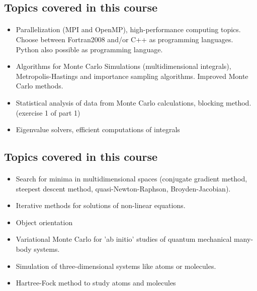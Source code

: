 \documentclass[%
twoside,                 %
final,                   %
10pt]{article}
\begin{document}
\noindent




\subsection{Topics covered in this course}

\paragraph{}
\begin{itemize}
  \item Parallelization (MPI and OpenMP), high-performance computing topics. Choose between Fortran2008 and/or C++ as programming languages. Python also possible as programming language. 

  \item Algorithms for Monte Carlo Simulations (multidimensional integrals), Metropolis-Hastings and importance sampling algorithms.  Improved Monte Carlo methods.

  \item Statistical analysis of data  from Monte Carlo calculations, blocking method. (exercise 1 of part 1)

  \item Eigenvalue solvers, efficient computations of integrals
\end{itemize}

\noindent



\subsection{Topics covered in this course}

\paragraph{}
\begin{itemize}
  \item Search for minima in multidimensional spaces (conjugate gradient method, steepest descent method, quasi-Newton-Raphson, Broyden-Jacobian).

  \item Iterative methods for solutions of non-linear equations.

  \item Object orientation

  \item Variational Monte Carlo for 'ab initio' studies of quantum mechanical many-body systems.

  \item Simulation of three-dimensional systems like atoms or molecules.

  \item Hartree-Fock method to study atoms and molecules
\end{itemize}
\end{document}
